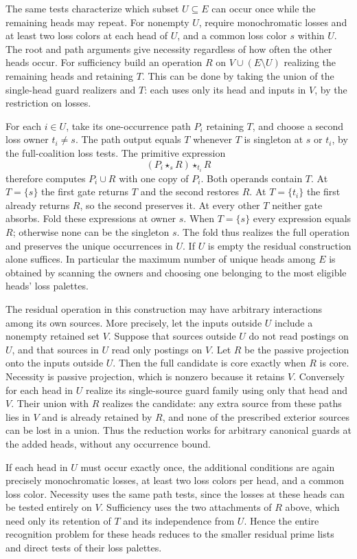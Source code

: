 The same tests characterize which subset $U\subseteq E$ can
occur once while the remaining heads may repeat. For nonempty
$U$, require monochromatic losses and at least two loss colors
at each head of $U$, and a common loss color $s$ within $U$.
The root and path arguments give necessity regardless of how
often the other heads occur. For sufficiency build an operation
$R$ on $V\cup(E\setminus U)$ realizing the remaining heads and
retaining $T$. This can be done by taking the union of the
single-head guard realizers and $T$: each uses only its head
and inputs in $V$, by the restriction on losses.

For each $i\in U$, take its one-occurrence path $P_i$ retaining
$T$, and choose a second loss owner $t_i\ne s$. The path output
equals $T$ whenever $T$ is singleton at $s$ or $t_i$, by the
full-coalition loss tests. The primitive expression
\[
  (P_i\star_s R)\star_{t_i}R
\]
therefore computes $P_i\cup R$ with one copy of $P_i$. Both
operands contain $T$. At $T=\{s\}$ the first gate returns $T$
and the second restores $R$. At $T=\{t_i\}$ the first already
returns $R$, so the second preserves it. At every other $T$
neither gate absorbs. Fold these expressions at owner $s$.
When $T=\{s\}$ every expression equals $R$; otherwise none can
be the singleton $s$. The fold thus realizes the full operation
and preserves the unique occurrences in $U$. If $U$ is empty
the residual construction alone suffices. In particular the
maximum number of unique heads among $E$ is obtained by scanning
the owners and choosing one belonging to the most eligible
heads' loss palettes.

The residual operation in this construction may have arbitrary
interactions among its own sources. More precisely, let the
inputs outside $U$ include a nonempty retained set $V$. Suppose
that sources outside $U$ do not read postings on $U$, and that
sources in $U$ read only postings on $V$. Let $R$ be the passive
projection onto the inputs outside $U$. Then the full candidate
is core exactly when $R$ is core. Necessity is passive projection,
which is nonzero because it retains $V$. Conversely for each
head in $U$ realize its single-source guard family using only
that head and $V$. Their union with $R$ realizes the candidate:
any extra source from these paths lies in $V$ and is already
retained by $R$, and none of the prescribed exterior sources can
be lost in a union. Thus the reduction works for arbitrary
canonical guards at the added heads, without any occurrence
bound.

If each head in $U$ must occur exactly once, the additional
conditions are again precisely monochromatic losses, at least
two loss colors per head, and a common loss color. Necessity
uses the same path tests, since the losses at these heads can
be tested entirely on $V$. Sufficiency uses the two attachments
of $R$ above, which need only its retention of $T$ and its
independence from $U$. Hence the entire recognition problem for
these heads reduces to the smaller residual prime lists and
direct tests of their loss palettes.


